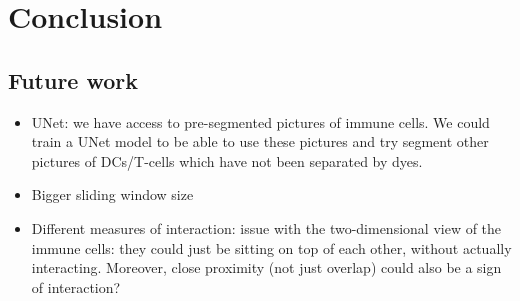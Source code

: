 \chapter{Conclusion}

\section{Future work}

\begin{itemize}
    \item UNet: we have access to pre-segmented pictures of immune cells. We could train a UNet model to be able to use these pictures and try segment other pictures of DCs/T-cells which have not been separated by dyes.
    \item Bigger sliding window size
    \item Different measures of interaction: issue with the two-dimensional view of the immune cells: they could just be sitting on top of each other, without actually interacting. Moreover, close proximity (not just overlap) could also be a sign of interaction?
\end{itemize}
